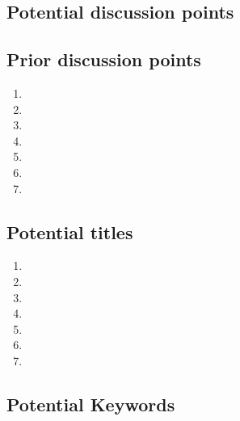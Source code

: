 \documentclass[11pt,letterpaper]{article}
\begin{document}
\subsection{Potential discussion points}
\label{sec:org8ed31ea}



\subsection{Prior discussion points}
\label{sec:orgb896e3b}

\begin{enumerate}
\item 

\item 

\item 

\item 

\item 

\item 

\item 
\end{enumerate}

\subsection{Potential titles}
\label{sec:org5ee1b74}

\begin{enumerate}
\item 

\item 

\item 

\item 

\item 

\item 

\item 
\end{enumerate}




\subsection{Potential Keywords}
\label{sec:org9e68ebf}
\end{document}

